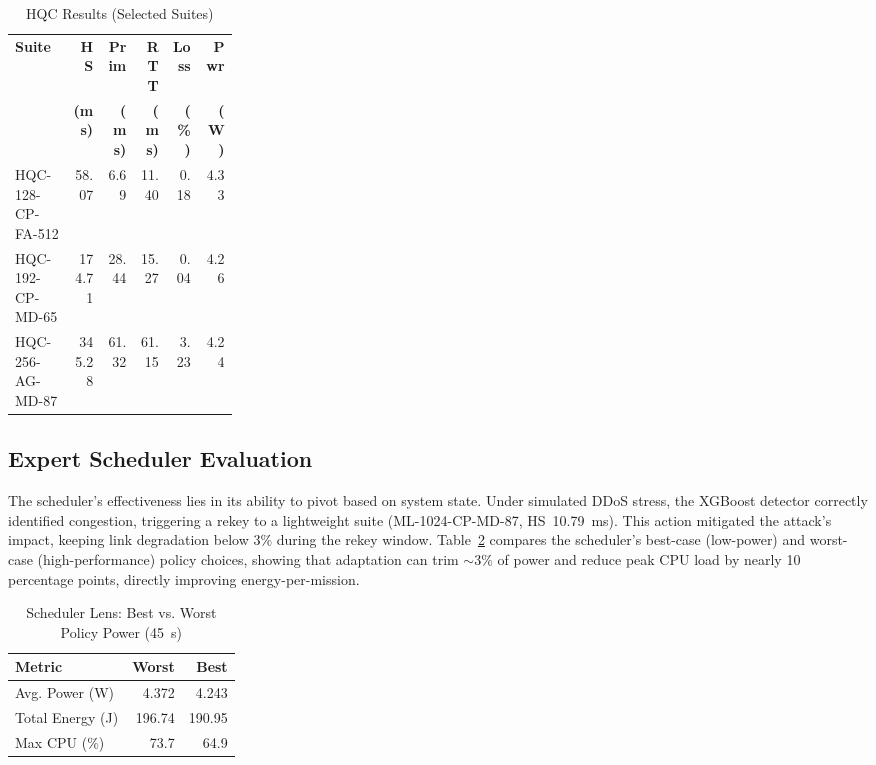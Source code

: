 \documentclass[sigconf,natbib=false]{acmart}
\begin{document}
\begin{table}[ht]
\centering
\caption{HQC Results (Selected Suites)}
\label{tab:hqc_results}
\begingroup
\footnotesize
\setlength{\tabcolsep}{2pt}
\begin{tabular}{@{}p{0.26\linewidth}rrrrr@{}}
\toprule
\textbf{Suite} & \textbf{HS} & \textbf{Prim} & \textbf{RTT} & \textbf{Loss} & \textbf{Pwr} \\
 & \textbf{(ms)} & \textbf{(ms)} & \textbf{(ms)} & \textbf{(\%)} & \textbf{(W)} \\
\midrule
HQC-128-CP-FA-512 & 58.07 & 6.69 & 11.40 & 0.18 & 4.33 \\
HQC-192-CP-MD-65 & 174.71 & 28.44 & 15.27 & 0.04 & 4.26 \\
HQC-256-AG-MD-87 & 345.28 & 61.32 & 61.15 & 3.23 & 4.24 \\
\bottomrule
\end{tabular}
\endgroup
\end{table}

\subsection{Expert Scheduler Evaluation}

The scheduler's effectiveness lies in its ability to pivot based on system state. Under simulated DDoS stress, the XGBoost detector correctly identified congestion, triggering a rekey to a lightweight suite (ML-1024-CP-MD-87, HS~10.79~ms). This action mitigated the attack's impact, keeping link degradation below 3\% during the rekey window. Table~\ref{tab:policy_power} compares the scheduler's best-case (low-power) and worst-case (high-performance) policy choices, showing that adaptation can trim $\sim$3\% of power and reduce peak CPU load by nearly 10 percentage points, directly improving energy-per-mission.

\begin{table}[ht]
\centering
\caption{Scheduler Lens: Best vs. Worst Policy Power (45~s)}
\label{tab:policy_power}
\begingroup
\small
\setlength{\tabcolsep}{4pt}
\begin{tabular}{@{}lrr@{}}
\toprule
\textbf{Metric} & \textbf{Worst} & \textbf{Best} \\
\midrule
Avg. Power (W) & 4.372 & 4.243 \\
Total Energy (J) & 196.74 & 190.95 \\
Max CPU (\%) & 73.7 & 64.9 \\
\bottomrule
\end{tabular}
\endgroup
\end{table}
\end{document}
